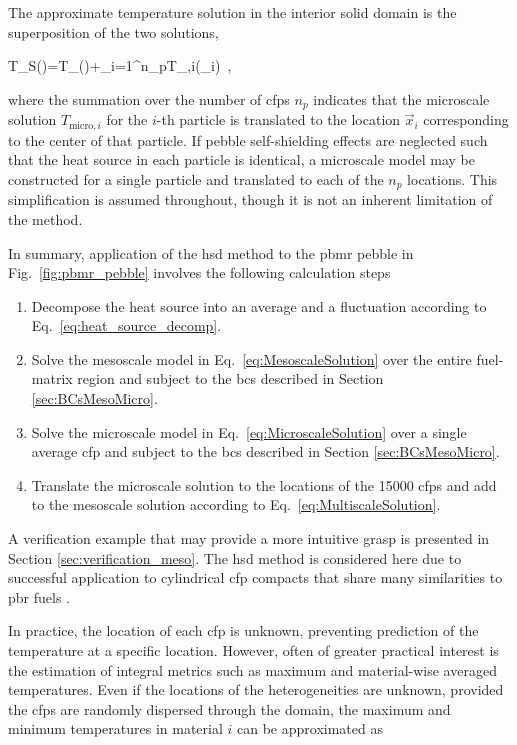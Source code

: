 The approximate temperature solution in the interior solid domain is the superposition of the two solutions,

\beq
\label{eq:MultiscaleSolution}
T_S()=T_()+\sum_{i=1}^{n_p}T_{,i}(_i)\ ,
\eeq

\noindent where the summation over the number of \glspl{cfp} \(n_p\) indicates that the microscale solution \(T_{\text{micro},i}\) for the \(i\)-th particle is translated to the location \(\vec{x}_i\) corresponding to the center of that particle. If pebble self-shielding effects are neglected such that the heat source in each particle is identical, a microscale model may be constructed for a single particle and translated to each of the \(n_p\) locations. This simplification is assumed throughout, though it is not an inherent limitation of the method. 

In summary, application of the \gls{hsd} method to the \gls{pbmr} pebble in Fig.\ \ref{fig:pbmr_pebble} involves the following calculation steps\mdash 

\begin{enumerate}
\itemsep0.3em
\item Decompose the heat source into an average and a fluctuation according to Eq.\ \eqref{eq:heat_source_decomp}.
\item Solve the mesoscale model in Eq.\ \eqref{eq:MesoscaleSolution} over the entire fuel-matrix region and subject to the \glspl{bc} described in Section \ref{sec:BCsMesoMicro}.
\item Solve the microscale model in Eq.\ \eqref{eq:MicroscaleSolution} over a single average \gls{cfp} and subject to the \glspl{bc} described in Section \ref{sec:BCsMesoMicro}.
\item Translate the microscale solution to the locations of the 15000 \glspl{cfp} and add to the mesoscale solution according to Eq.\ \eqref{eq:MultiscaleSolution}.
\end{enumerate}

A verification example that may provide a more intuitive grasp is presented in Section \ref{sec:verification_meso}. The \gls{hsd} method is considered here due to successful application to cylindrical \gls{cfp} compacts that share many similarities to \gls{pbr} fuels \cite{stainsby}.

In practice, the location of each \gls{cfp} is unknown, preventing prediction of the temperature at a specific location. However, often of greater practical interest is the estimation of integral metrics such as maximum and material-wise averaged temperatures. Even if the locations of the heterogeneities are unknown, provided the \glspl{cfp} are randomly dispersed through the domain, the maximum and minimum temperatures in material \(i\) can be approximated as

